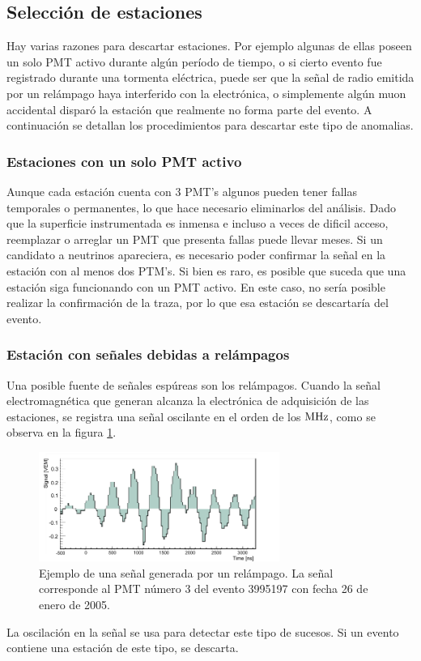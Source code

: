 	\subsection{Selección de estaciones}
	
	Hay varias razones para descartar estaciones. Por ejemplo algunas de ellas poseen un solo PMT activo durante algún período de tiempo, o si cierto evento fue registrado durante una tormenta eléctrica, puede ser que la señal de radio emitida por un relámpago haya interferido con la electrónica, o simplemente algún muon accidental disparó la estación que realmente no forma parte del evento.
	A continuación se detallan los procedimientos para descartar este tipo de anomalias.
	
		\subsubsection{Estaciones con un solo PMT activo}
		
		Aunque cada estación cuenta con 3 PMT's algunos pueden tener fallas temporales o permanentes, lo que hace necesario eliminarlos del análisis.
		Dado que la superficie instrumentada es inmensa e incluso a veces de dificil acceso, reemplazar o arreglar un PMT que presenta fallas puede llevar meses.
		Si un candidato a neutrinos apareciera, es necesario poder confirmar la señal en la estación con al menos dos PTM's. 
		Si bien es raro, es posible que suceda que una estación siga funcionando con un PMT activo.
		En este caso, no sería posible realizar la confirmación de la traza, por lo que esa estación se descartaría del evento.
		
		\subsubsection{Estación con señales debidas a relámpagos}
		
		Una posible fuente de señales espúreas son los relámpagos.
		Cuando la señal electromagnética que generan alcanza la electrónica de adquisición de las estaciones, se registra una señal oscilante en el orden de los $\rm MHz$, como se observa en la figura \ref{fig:event1186354_st506_pmt3}.
		\begin{figure}[th!]
		\begin{center}
		\includegraphics[width=0.7\textwidth]{fig/seleccionAuger/event3995197_station506_pmt3.pdf}
		\caption{Ejemplo de una señal generada por un relámpago.
		La señal corresponde al PMT número 3 del evento 3995197 con fecha 26 de enero de 2005.}
		\label{fig:event1186354_st506_pmt3}
		\end{center}
		\end{figure}
		La oscilación en la señal se usa para detectar este tipo de sucesos.
		Si un evento contiene una estación de este tipo, se descarta.
		
